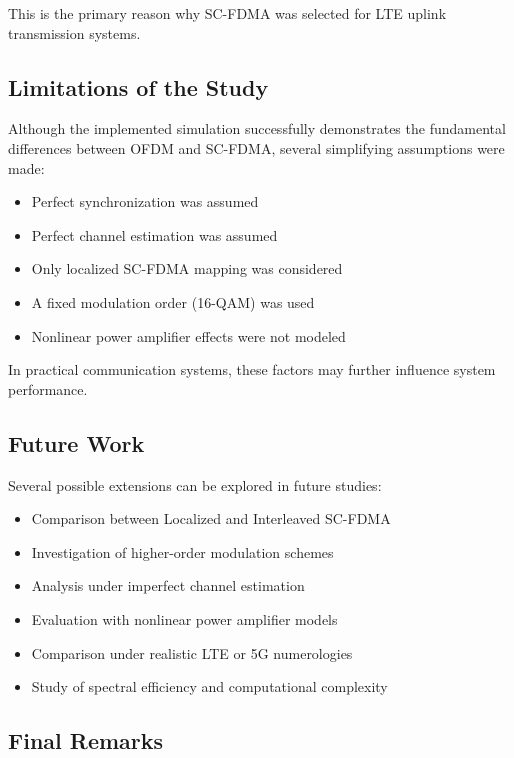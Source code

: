This is the primary reason why SC-FDMA was selected for LTE uplink
transmission systems.

\subsection{Limitations of the Study}

Although the implemented simulation successfully demonstrates the
fundamental differences between OFDM and SC-FDMA, several simplifying
assumptions were made:

\begin{itemize}
    \item Perfect synchronization was assumed
    \item Perfect channel estimation was assumed
    \item Only localized SC-FDMA mapping was considered
    \item A fixed modulation order (16-QAM) was used
    \item Nonlinear power amplifier effects were not modeled
\end{itemize}

In practical communication systems, these factors may further influence
system performance.

\subsection{Future Work}

Several possible extensions can be explored in future studies:

\begin{itemize}
    \item Comparison between Localized and Interleaved SC-FDMA
    \item Investigation of higher-order modulation schemes
    \item Analysis under imperfect channel estimation
    \item Evaluation with nonlinear power amplifier models
    \item Comparison under realistic LTE or 5G numerologies
    \item Study of spectral efficiency and computational complexity
\end{itemize}

\subsection{Final Remarks}

